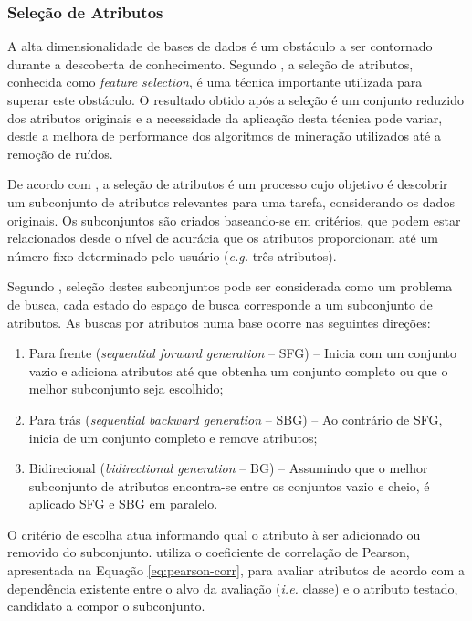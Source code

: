 \subsubsection{Seleção de Atributos}
\label{subsubsec:atribute-selection}

A alta dimensionalidade de bases de dados é um obstáculo a ser contornado durante a descoberta de conhecimento. Segundo , a seleção de atributos, conhecida como \textit{feature selection}, é uma técnica importante utilizada para superar este obstáculo. O resultado obtido após a seleção é um conjunto reduzido dos atributos originais e a necessidade da aplicação desta técnica pode variar, desde a melhora de performance dos algoritmos de mineração utilizados até a remoção de ruídos.

De acordo com , a seleção de atributos é um processo cujo objetivo é descobrir um subconjunto de atributos relevantes para uma tarefa, considerando os dados originais. Os subconjuntos são criados baseando-se em critérios, que podem estar relacionados desde o nível de acurácia que os atributos proporcionam até um número fixo determinado pelo usuário (\textit{e.g.} três atributos).

Segundo , seleção destes subconjuntos pode ser considerada como um problema de busca, cada estado do espaço de busca corresponde a um subconjunto de atributos. As buscas por atributos numa base ocorre nas seguintes direções:

\begin{enumerate}[label=\roman*.]
    \item Para frente (\textit{sequential forward generation} {--} SFG) {--} Inicia com um conjunto vazio e adiciona atributos até que obtenha um conjunto completo ou que o melhor subconjunto seja escolhido;
    \item Para trás (\textit{sequential backward generation} {--} SBG) {--} Ao contrário de SFG, inicia de um conjunto completo e remove atributos;
    \item Bidirecional (\textit{bidirectional generation} {--} BG) {--} Assumindo que o melhor subconjunto de atributos encontra-se entre os conjuntos vazio e cheio, é aplicado SFG e SBG em paralelo.
\end{enumerate}

O critério de escolha atua informando qual o atributo à ser adicionado ou removido do subconjunto.  utiliza o coeficiente de correlação de Pearson, apresentada na Equação \ref{eq:pearson-corr}, para avaliar atributos de acordo com a dependência existente entre o alvo da avaliação (\textit{i.e.} classe) e o atributo testado, candidato a compor o subconjunto.

